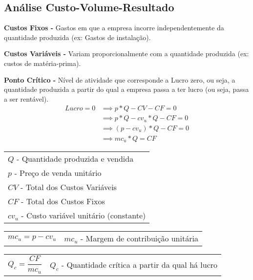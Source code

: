 \documentclass[11pt]{article}
\begin{document}
\subsection{Análise Custo-Volume-Resultado}

\textbf{Custos Fixos -} Gastos em que a empresa incorre independentemente da quantidade produzida (ex: Gastos de instalação).

\textbf{Custos Variáveis -} Variam proporcionalmente com a quantidade produzida (ex: custos de matéria-prima).

\textbf{Ponto Crítico -} Nível de atividade que corresponde a Lucro zero, ou seja, a quantidade produzida a partir do qual a empresa passa a ter lucro (ou seja, passa a ser rentável).
\begin{align*}
    Lucro = 0 & \implies p * Q - CV - CF = 0       \\
              & \implies p * Q - cv_u * Q - CF = 0 \\
              & \implies (p - cv_u) * Q - CF = 0   \\
              & \implies mc_u * Q = CF
\end{align*}
\begin{center}
    \begin{tabular}{l}
        $Q$ - Quantidade produzida e vendida         \\
        $p$ - Preço de venda unitário                \\
        $CV$ - Total dos Custos Variáveis            \\
        $CF$ - Total dos Custos Fixos                \\
        $cv_u$ - Custo variável unitário (constante) \\
    \end{tabular}
\end{center}

\begin{tabular}{ c c }
    \begin{minipage}{0.45\textwidth}
        \begin{equation*}
            mc_u = p - cv_u
        \end{equation*}
    \end{minipage} &
    \begin{minipage}{0.45\textwidth}
        $mc_u$ - Margem de contribuição unitária
    \end{minipage}
\end{tabular}

\begin{tabular}{ c c }
    \begin{minipage}{0.45\textwidth}
        \begin{equation*}
            Q_c = \frac{CF}{mc_u}
        \end{equation*}
    \end{minipage} &
    \begin{minipage}{0.45\textwidth}
        $Q_c$ - Quantidade crítica a partir da qual há lucro
    \end{minipage}
\end{tabular}
\end{document}
